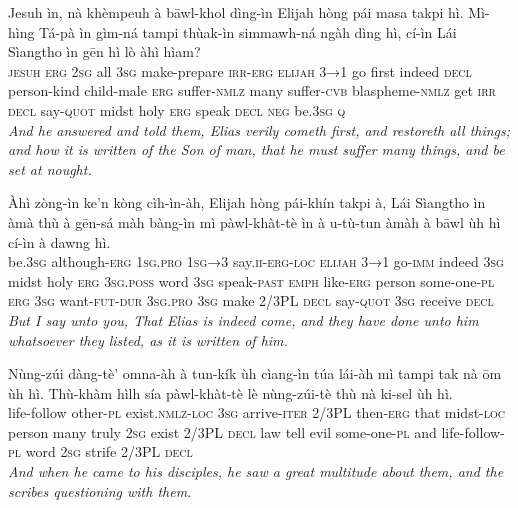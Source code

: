 \documentclass[11pt,a4paper]{article}
\begin{document}
\begin{exe}
\gll Jesuh ìn, nà khèmpeuh à bāwl-khol dìng-ìn Elijah hòng pái masa takpi hì. Mì-hìng Tá-pà ìn gìm-ná tampi thùak-ìn simmawh-ná ngàh dìng hì, cí-ìn Lái Sìangtho ìn gēn hì lò àhì hìam? \\
     \textsc{jesuh} \textsc{erg} \textsc{2sg} all \textsc{3sg} make-prepare \textsc{irr}-\textsc{erg} \textsc{elijah} \textsc{3→1} go first indeed \textsc{decl} person-kind child-male \textsc{erg} suffer-\textsc{nmlz} many suffer-\textsc{cvb} blaspheme-\textsc{nmlz} get \textsc{irr} \textsc{decl} say-\textsc{quot} midst holy \textsc{erg} speak \textsc{decl} \textsc{neg} be.\textsc{3sg} \textsc{q} \\
\glt \textcolor{kjvcolor}{\textit{And he answered and told them, Elias verily cometh first, and restoreth all things; and how it is written of the Son of man, that he must suffer many things, and be set at nought.}}

\gll Àhì zòng-ìn ke'n kòng cìh-ìn-àh, Elijah hòng pái-khín takpi à, Lái Sìangtho ìn àmà thù à gēn-sá màh bàng-ìn mì pàwl-khàt-tè ìn à u-tù-tun àmàh à bāwl ùh hì cí-ìn à dawng hì. \\
     be.\textsc{3sg} although-\textsc{erg} \textsc{1sg}.\textsc{pro} \textsc{1sg→3} say.\textsc{ii}-\textsc{erg}-\textsc{loc} \textsc{elijah} \textsc{3→1} go-\textsc{imm} indeed \textsc{3sg} midst holy \textsc{erg} \textsc{3sg}.\textsc{poss} word \textsc{3sg} speak-\textsc{past} \textsc{emph} like-\textsc{erg} person some-one-\textsc{pl} \textsc{erg} \textsc{3sg} want-\textsc{fut}-\textsc{dur} \textsc{3sg}.\textsc{pro} \textsc{3sg} make 2/3PL \textsc{decl} say-\textsc{quot} \textsc{3sg} receive \textsc{decl} \\
\glt \textcolor{kjvcolor}{\textit{But I say unto you, That Elias is indeed come, and they have done unto him whatsoever they listed, as it is written of him.}}

\gll Nùng-zúi dàng-tè' omna-àh à tun-kík ùh cìang-ìn túa lái-àh mì tampi tak nà ōm ùh hì. Thù-khàm hìlh sía pàwl-khàt-tè lè nùng-zúi-tè thù nà ki-sel ùh hì. \\
     life-follow other-\textsc{pl} exist.\textsc{nmlz}-\textsc{loc} \textsc{3sg} arrive-\textsc{iter} 2/3PL then-\textsc{erg} that midst-\textsc{loc} person many truly \textsc{2sg} exist 2/3PL \textsc{decl} law tell evil some-one-\textsc{pl} and life-follow-\textsc{pl} word \textsc{2sg} strife 2/3PL \textsc{decl} \\
\glt \textcolor{kjvcolor}{\textit{And when he came to his disciples, he saw a great multitude about them, and the scribes questioning with them.}}


\end{exe}
\end{document}

